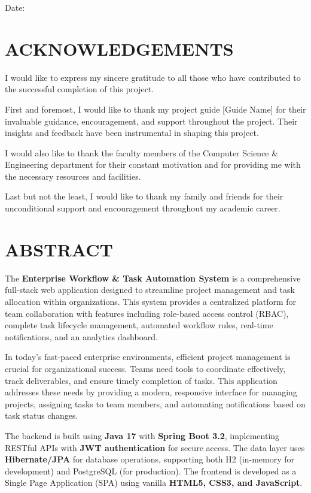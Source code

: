 \documentclass[12pt,a4paper,twoside]{book}
\begin{document}
\bigskip
\bigskip
\bigskip

Date:

\newpage

\section*{ACKNOWLEDGEMENTS}

I would like to express my sincere gratitude to all those who have contributed to the successful completion of this project.

First and foremost, I would like to thank my project guide [Guide Name] for their invaluable guidance, encouragement, and support throughout the project. Their insights and feedback have been instrumental in shaping this project.

I would also like to thank the faculty members of the Computer Science \& Engineering department for their constant motivation and for providing me with the necessary resources and facilities.

Last but not the least, I would like to thank my family and friends for their unconditional support and encouragement throughout my academic career.

\newpage

\section*{ABSTRACT}

The \textbf{Enterprise Workflow \& Task Automation System} is a comprehensive full-stack web application designed to streamline project management and task allocation within organizations. This system provides a centralized platform for team collaboration with features including role-based access control (RBAC), complete task lifecycle management, automated workflow rules, real-time notifications, and an analytics dashboard.

In today's fast-paced enterprise environments, efficient project management is crucial for organizational success. Teams need tools to coordinate effectively, track deliverables, and ensure timely completion of tasks. This application addresses these needs by providing a modern, responsive interface for managing projects, assigning tasks to team members, and automating notifications based on task status changes.

The backend is built using \textbf{Java 17} with \textbf{Spring Boot 3.2}, implementing RESTful APIs with \textbf{JWT authentication} for secure access. The data layer uses \textbf{Hibernate/JPA} for database operations, supporting both H2 (in-memory for development) and PostgreSQL (for production). The frontend is developed as a Single Page Application (SPA) using vanilla \textbf{HTML5, CSS3, and JavaScript}.
\end{document}
